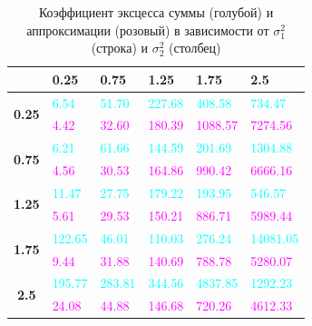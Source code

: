\documentclass[12pt]{article}
\begin{document}
\begin{table}[!hhh]
	\centering
	\caption{Коэффициент эксцесса суммы (голубой) и аппроксимации (розовый) в зависимости от $\sigma_{1}^{2}$ (строка) и $\sigma_{2}^{2}$ (столбец) }
	\begin{tabular}{|c|l|l|l|l|l|}
		\hline
		& \textbf{0.25} & \textbf{0.75} & \textbf{1.25} & \textbf{1.75} & \textbf{2.5} \\ \hline
		\multirow{2}{*}{\textbf{0.25}} & \textcolor{cyan}{6.54}          & \textcolor{cyan}{51.70}         & \textcolor{cyan}{227.68}        & \textcolor{cyan}{408.58}        & \textcolor{cyan}{734.47}       \\ \cline{2-6} 
		& \textcolor{magenta}{4.42}          & \textcolor{magenta}{32.60}         & \textcolor{magenta}{180.39}        & \textcolor{magenta}{1088.57}       & \textcolor{magenta}{7274.56}      \\ \hline
		\multirow{2}{*}{\textbf{0.75}} & \textcolor{cyan}{6.21}          & \textcolor{cyan}{61.66}         & \textcolor{cyan}{144.59}        & \textcolor{cyan}{201.69}        & \textcolor{cyan}{1304.88}      \\ \cline{2-6} 
		& \textcolor{magenta}{4.56}          & \textcolor{magenta}{30.53}         & \textcolor{magenta}{164.86}        & \textcolor{magenta}{990.42}        & \textcolor{magenta}{6666.16}      \\ \hline
		\multirow{2}{*}{\textbf{1.25}} & \textcolor{cyan}{11.47}         & \textcolor{cyan}{27.75}         & \textcolor{cyan}{179.22}        & \textcolor{cyan}{193.95}        & \textcolor{cyan}{546.57}       \\ \cline{2-6} 
		& \textcolor{magenta}{5.61}          & \textcolor{magenta}{29.53}         & \textcolor{magenta}{150.21}        & \textcolor{magenta}{886.71}        & \textcolor{magenta}{5989.44}      \\ \hline
		\multirow{2}{*}{\textbf{1.75}} & \textcolor{cyan}{122.65}        & \textcolor{cyan}{46.01}         & \textcolor{cyan}{110.03}        & \textcolor{cyan}{276.24}        & \textcolor{cyan}{14081.05}     \\ \cline{2-6} 
		& \textcolor{magenta}{9.44}          & \textcolor{magenta}{31.88}         & \textcolor{magenta}{140.69}        & \textcolor{magenta}{788.78}        & \textcolor{magenta}{5280.07}      \\ \hline
		\multirow{2}{*}{\textbf{2.5}}  & \textcolor{cyan}{195.77}        & \textcolor{cyan}{283.81}        & \textcolor{cyan}{344.56}        & \textcolor{cyan}{4837.85}       & \textcolor{cyan}{1292.23}      \\ \cline{2-6} 
		& \textcolor{magenta}{24.08}         & \textcolor{magenta}{44.88}         & \textcolor{magenta}{146.68}        & \textcolor{magenta}{720.26}        & \textcolor{magenta}{4612.33}      \\ \hline
	\end{tabular}
\end{table}
\end{document}
